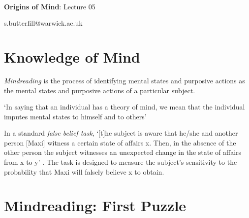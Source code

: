 \documentclass[12pt]{extarticle}
\date{}
\makeatletter
\def \ititle {Origins of Mind}
\def \isubtitle {Lecture 02}
\def \iemail{s.butterfill@warwick.ac.uk}
\makeatother
\begin{document}
\begin{multicols}{3}

\setlength\footnotesep{1em}







\def \ititle {Origins of Mind}
 
\def \isubtitle {Lecture 05}
 
 
 
\
 
 
 
\begin{center}
 
{\Large
 
\textbf{\ititle}: \isubtitle
 
}
 
 
 
\iemail %
 
\end{center}
 
 
 
\section{Knowledge of Mind}
 
\textit{Mindreading} is 
the process of 
identifying mental states and purposive actions 
as the mental states and purposive actions of a particular subject.
 
‘In saying that an individual has a theory of mind, we mean that the individual imputes mental states to himself and to others’ 
\citep[p.\ 515]{premack_does_1978}
 
In a standard \textit{false belief task}, `[t]he subject is aware that he/she and another person [Maxi] witness a certain state of affairs x.  Then, in the absence of the other  
person the subject witnesses an unexpected change in the state of affairs from x to y' \citep[p.\ 106]{Wimmer:1983dz}. 
The task is designed to measure the subject's sensitivity to the probability that Maxi will falsely believe x to obtain.
 
 
 
\section{Mindreading: First Puzzle}
 

\end{multicols}
\end{document}

